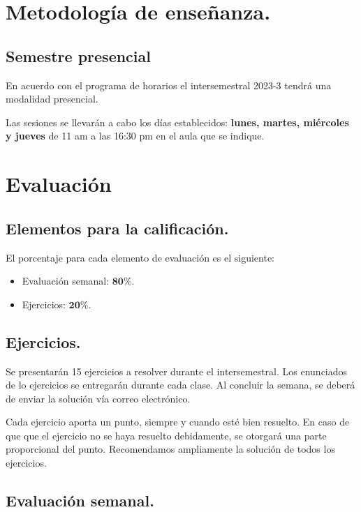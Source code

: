 \section{Metodología de enseñanza.}

\subsection{Semestre presencial}

En acuerdo con el programa de horarios el intersemestral 2023-3 tendrá una modalidad presencial.
\par
Las sesiones se llevarán a cabo los días establecidos: \textbf{lunes, martes, miércoles y jueves} de 11 am a las 16:30 pm en el aula que se indique.

\section{Evaluación}

\subsection{Elementos para la calificación.}

El porcentaje para cada elemento de evaluación es el siguiente:
\begin{itemize}
\setlength{\itemsep}{0mm}
\item Evaluación semanal: $\mathbf{80\%}$.
\item Ejercicios: $\mathbf{20\%}$.
\end{itemize}

\subsection{Ejercicios.}

Se presentarán 15 ejercicios a resolver durante el intersemestral. Los enunciados de lo ejercicios se entregarán durante cada clase.  Al concluir la semana, se deberá de enviar la solución vía correo electrónico.
\par
Cada ejercicio aporta un punto, siempre y cuando esté bien resuelto. En caso de que que el ejercicio no se haya resuelto debidamente, se otorgará una parte proporcional del punto. Recomendamos ampliamente la solución de todos los ejercicios.
\par

\subsection{Evaluación semanal.}

